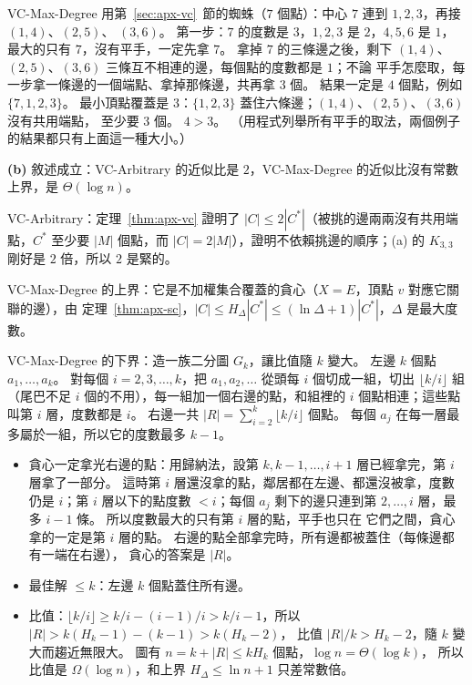 VC-Max-Degree 用第~\ref{sec:apx-vc}~節的蜘蛛（$7$ 個點）：中心 $7$ 連到 $1, 2, 3$，再接 $(1,4)$、$(2,5)$、
$(3,6)$。 第一步：$7$ 的度數是 $3$，$1, 2, 3$ 是 $2$，$4, 5, 6$ 是 $1$，最大的只有 $7$，沒有平手，一定先拿
$7$。 拿掉 $7$ 的三條邊之後，剩下 $(1,4)$、$(2,5)$、$(3,6)$ 三條互不相連的邊，每個點的度數都是 $1$；不論
平手怎麼取，每一步拿一條邊的一個端點、拿掉那條邊，共再拿 $3$ 個。 結果一定是 $4$ 個點，例如
$\{7, 1, 2, 3\}$。 最小頂點覆蓋是 $3$：$\{1, 2, 3\}$ 蓋住六條邊；$(1,4)$、$(2,5)$、$(3,6)$ 沒有共用端點，
至少要 $3$ 個。 $4 > 3$。 （用程式列舉所有平手的取法，兩個例子的結果都只有上面這一種大小。）

\textbf{(b)} 敘述成立：VC-Arbitrary 的近似比是 $2$，VC-Max-Degree 的近似比沒有常數上界，是
$\Theta(\log n)$。

VC-Arbitrary：定理~\ref{thm:apx-vc} 證明了 $|C| \le 2|C^*|$（被挑的邊兩兩沒有共用端點，$C^*$ 至少要
$|M|$ 個點，而 $|C| = 2|M|$），證明不依賴挑邊的順序；(a) 的 $K_{3,3}$ 剛好是 $2$ 倍，所以 $2$ 是緊的。

VC-Max-Degree 的上界：它是不加權集合覆蓋的貪心（$X = E$，頂點 $v$ 對應它關聯的邊），由
定理~\ref{thm:apx-sc}，$|C| \le H_\Delta |C^*| \le (\ln \Delta + 1)|C^*|$，$\Delta$ 是最大度數。

VC-Max-Degree 的下界：造一族二分圖 $G_k$，讓比值隨 $k$ 變大。 左邊 $k$ 個點 $a_1, \ldots, a_k$。 對每個
$i = 2, 3, \ldots, k$，把 $a_1, a_2, \ldots$ 從頭每 $i$ 個切成一組，切出 $\lfloor k/i \rfloor$ 組（尾巴不足
$i$ 個的不用），每一組加一個右邊的點，和組裡的 $i$ 個點相連；這些點叫第 $i$ 層，度數都是 $i$。 右邊一共
$|R| = \sum_{i=2}^{k} \lfloor k/i \rfloor$ 個點。 每個 $a_j$ 在每一層最多屬於一組，所以它的度數最多
$k - 1$。

\begin{itemize}
\item 貪心一定拿光右邊的點：用歸納法，設第 $k, k - 1, \ldots, i + 1$ 層已經拿完，第 $i$ 層拿了一部分。
這時第 $i$ 層還沒拿的點，鄰居都在左邊、都還沒被拿，度數仍是 $i$；第 $i$ 層以下的點度數 $< i$；每個
$a_j$ 剩下的邊只連到第 $2, \ldots, i$ 層，最多 $i - 1$ 條。 所以度數最大的只有第 $i$ 層的點，平手也只在
它們之間，貪心拿的一定是第 $i$ 層的點。 右邊的點全部拿完時，所有邊都被蓋住（每條邊都有一端在右邊），
貪心的答案是 $|R|$。
\item 最佳解 $\le k$：左邊 $k$ 個點蓋住所有邊。
\item 比值：$\lfloor k/i \rfloor \ge k/i - (i-1)/i > k/i - 1$，所以 $|R| > k(H_k - 1) - (k - 1) > k(H_k - 2)$，
比值 $|R|/k > H_k - 2$，隨 $k$ 變大而趨近無限大。 圖有 $n = k + |R| \le k H_k$ 個點，$\log n = \Theta(\log k)$，
所以比值是 $\Omega(\log n)$，和上界 $H_\Delta \le \ln n + 1$ 只差常數倍。
\end{itemize}

